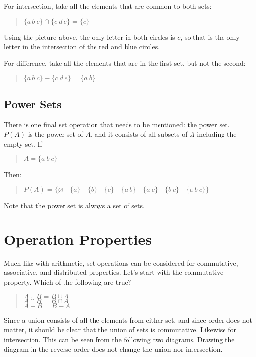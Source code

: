\documentclass[letterpaper,12pt,openany,reqno]{book}%
\begin{document}
For intersection, take all the elements that are common to both sets:
\begin{quote}
$\{ a \ b \ c\} \cap \{ c \ d \ e\} = \{ c \}$
\end{quote}

Using the picture above, the only letter in both circles is $c$, so that is the only letter in the intersection of the red and blue circles.

For difference, take all the elements that are in the first set, but not the second:
\begin{quote}
$\{ a \ b \ c\} - \{ c \ d \ e\} = \{ a \ b \}$
\end{quote}

\subsection{Power Sets}
There is one final set operation that needs to be mentioned: the power set. $P(A)$ is the power set of $A$, and it consists of all subsets of $A$ including the empty set. If
\begin{quote}
$A = \{ a \ b \ c \}$
\end{quote}
Then:
\begin{quote}
$P(A) = \{ \varnothing \quad \{a\} \quad \{b\} \quad \{c\} \quad \{a \ b\} \quad \{a \ c\} \quad \{b\ c\} \quad \{a \ b \ c\}\}$
\end{quote}
Note that the power set is always a set of sets.

\section{Operation Properties}
Much like with arithmetic, set operations can be considered for commutative, associative, and distributed properties. Let's start with the commutative property. Which of the following are true?
\begin{quote}
$A \cup B = B \cup A$\\
$A \cap B = B \cap A$\\
$A - B = B - A$
\end{quote}

Since a union consists of all the elements from either set, and since order does not matter, it should be clear that the union of sets is commutative. Likewise for intersection. This can be seen from the following two diagrams. Drawing the diagram in the reverse order does not change the union nor intersection.
\end{document}
